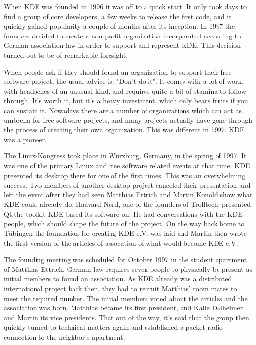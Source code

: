 

\noindent{}When KDE was founded in 1996 it was off to a quick start. It only took days to find a group of core developers, a few weeks to release the first code, and it quickly gained popularity a couple of months after its inception. In 1997 the founders decided to create a non-profit organization incorporated according to German association law in order to support and represent KDE. This decision turned out to be of remarkable foresight.

When people ask if they should found an organization to support their free software project, the usual advice is: "Don't do it". It comes with a lot of work, with headaches of an unusual kind, and requires quite a bit of stamina to follow through. It's worth it, but it's a heavy investment, which only bears fruits if you can sustain it. Nowadays there are a number of organizations which can act as umbrella for free software projects, and many projects actually have gone through the process of creating their own organization. This was different in 1997. KDE was a pioneer.

The Linux-Kongress took place in Würzburg, Germany, in the spring of 1997. It was one of the primary Linux and free software related events at that time. KDE presented its desktop there for one of the first times. This was an overwhelming success. Two members of another desktop project canceled their presentation and left the event after they had seen Matthias Ettrich and Martin Konold show what KDE could already do. Haavard Nord, one of the founders of Trolltech, presented Qt,the toolkit KDE based its software on. He had conversations with the KDE people, which should shape the future of the project. On the way back home to Tübingen the foundation for creating KDE e.V. was laid and Martin then wrote the first version of the articles of assocation of what would become KDE e.V.

The founding meeting was scheduled for October 1997 in the student apartment of Matthias Ettrich. German law requires seven people to physically be present as initial members to found an association. As KDE already was a distributed international project back then, they had to recruit Matthias' room mates to meet the required number. The initial members voted about the articles and the association was born. Matthias became its first president, and Kalle Dalheimer and Martin its vice presidents. That out of the way, it's said that the group then quickly turned to technical matters again and established a packet radio connection to the neighbor's apartment.

